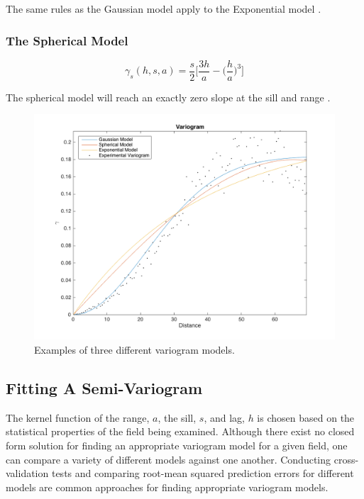 The same rules as the Gaussian model apply to the Exponential model \cite{goov:97}.

\subsubsection{The Spherical Model}

\begin{equation}
	\gamma_s(h, s, a) = \frac{s}{2} \Bigg[ \dfrac{3h}{a} - \Bigg( \dfrac{h}{a} \Bigg)^3 \Bigg]
	\label{eq:sph_model}
\end{equation}

The spherical model will reach an exactly zero slope at the sill and range \cite{goov:97}.

\begin{figure}[htb!]
    \centering    
    \includegraphics[width=0.8\linewidth]{figures/fit_kern_comp.png}
    \ssp
    \caption{Examples of three different variogram models.}
    \label{fig:fit_kernel_cop}
\end{figure}

\subsection{Fitting A Semi-Variogram} \label{sec:varfit}
The kernel function of the range, $a$, the sill, $s$, and lag, $h$ is chosen based on the statistical properties of the field being examined. Although there exist no closed form solution for finding an appropriate variogram model for a given field, one can compare a variety of different models against one another. Conducting cross-validation tests and comparing root-mean squared prediction errors for different models are common approaches for finding appropriate variogram models.

